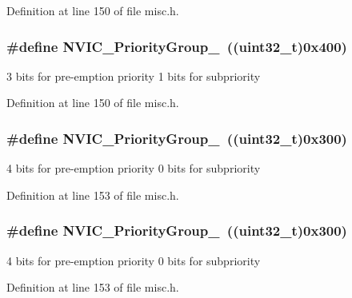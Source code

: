 Definition at line 150 of file misc.\+h.

\subsubsection[{\texorpdfstring{N\+V\+I\+C\+\_\+\+Priority\+Group\+\_\+3}{NVIC_PriorityGroup_3}}]{\setlength{\rightskip}{0pt plus 5cm}\#define N\+V\+I\+C\+\_\+\+Priority\+Group\+\_~(({\bf uint32\+\_\+t})0x400)}\hypertarget{group___preemption___priority___group_ga49bdbee77d4a70339d63c80462d49b4d}{}\label{group___preemption___priority___group_ga49bdbee77d4a70339d63c80462d49b4d}
3 bits for pre-\/emption priority 1 bits for subpriority 

Definition at line 150 of file misc.\+h.

\subsubsection[{\texorpdfstring{N\+V\+I\+C\+\_\+\+Priority\+Group\+\_\+4}{NVIC_PriorityGroup_4}}]{\setlength{\rightskip}{0pt plus 5cm}\#define N\+V\+I\+C\+\_\+\+Priority\+Group\+\_~(({\bf uint32\+\_\+t})0x300)}\hypertarget{group___preemption___priority___group_gaf9020c585da2a299328f0b06dee391a2}{}\label{group___preemption___priority___group_gaf9020c585da2a299328f0b06dee391a2}
4 bits for pre-\/emption priority 0 bits for subpriority 

Definition at line 153 of file misc.\+h.

\subsubsection[{\texorpdfstring{N\+V\+I\+C\+\_\+\+Priority\+Group\+\_\+4}{NVIC_PriorityGroup_4}}]{\setlength{\rightskip}{0pt plus 5cm}\#define N\+V\+I\+C\+\_\+\+Priority\+Group\+\_~(({\bf uint32\+\_\+t})0x300)}\hypertarget{group___preemption___priority___group_gaf9020c585da2a299328f0b06dee391a2}{}\label{group___preemption___priority___group_gaf9020c585da2a299328f0b06dee391a2}
4 bits for pre-\/emption priority 0 bits for subpriority 

Definition at line 153 of file misc.\+h.

